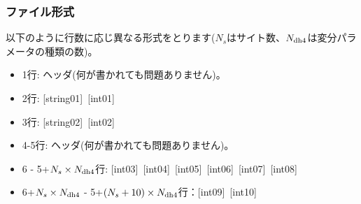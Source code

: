 \subsubsection{ファイル形式}
以下のように行数に応じ異なる形式をとります($N_s$はサイト数、$N_{\rm dh4}$は変分パラメータの種類の数)。
 \begin{itemize}
   \item  1行:  ヘッダ(何が書かれても問題ありません)。
   \item  2行:   [string01]~[int01]
   \item  3行:   [string02]~[int02]
   \item  4-5行:  ヘッダ(何が書かれても問題ありません)。
   \item  6 - 5+$N_s\times N_{\rm dh4}$行: [int03]~[int04]~[int05]~[int06]~[int07]~[int08]
   \item  6+$N_s\times N_{\rm dh4}$ - 5+$(N_s+10) \times N_{\rm dh4}$行：[int09]~[int10]
  \end{itemize}
